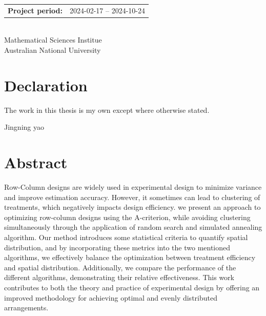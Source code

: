 \documentclass[
  a4paper,
  oneside,
  openany,
  12pt,
  onecolumn]{book}
\renewcommand*\contentsname{Table of contents}
\newcommand\contentsname{Table of contents}
\theoremstyle{definition}
\theoremstyle{definition}
\theoremstyle{plain}
\theoremstyle{remark}
\begin{document}
\begin{frontmatter}
\begin{titlepage}
\begin{titlepage}
\begin{tabular}{lp{40cm}}
     {\bf Project period:} & 2024-02-17 -- 2024-10-24 \\[2mm]
   \end{tabular}\\[2mm]

  \noindent Mathematical Sciences Institue\\
  \noindent Australian National University

  \end{titlepage}
  \setlength{\parindent}{0pt}
  \setlength{\parskip}{1ex plus 0.5ex minus 0.2ex}








  \end{titlepage}
  \end{frontmatter}


\renewcommand*\contentsname{Table of contents}
{
\setcounter{tocdepth}{2}
\tableofcontents
}
\listoffigures
{}
\listoftables
{}
\mainmatter
{}

\chapter*{Declaration}\label{declaration}


The work in this thesis is my own except where otherwise stated.

Jingning yao


\chapter*{Abstract}\label{abstract}


Row-Column designs are widely used in experimental design to minimize
variance and improve estimation accuracy. However, it sometimes can lead
to clustering of treatments, which negatively impacts design efficiency.
we present an approach to optimizing row-column designs using the
A-criterion, while avoiding clustering simultaneously through the
application of random search and simulated annealing algorithm. Our
method introduces some statistical criteria to quantify spatial
distribution, and by incorporating these metrics into the two mentioned
algorithms, we effectively balance the optimization between treatment
efficiency and spatial distribution. Additionally, we compare the
performance of the different algorithms, demonstrating their relative
effectiveness. This work contributes to both the theory and practice of
experimental design by offering an improved methodology for achieving
optimal and evenly distributed arrangements.
\end{document}
